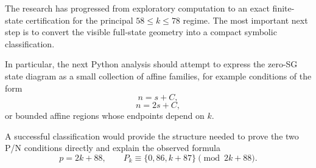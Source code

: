 \documentclass[11pt]{article}
\begin{document}
The research has progressed from exploratory computation to an exact finite-state certification for the principal $58\le k\le78$ regime. The most important next step is to convert the visible full-state geometry into a compact symbolic classification.

In particular, the next Python analysis should attempt to express the zero-SG state diagram as a small collection of affine families, for example conditions of the form
\begin{equation}
    n=s+C,
\end{equation}
\begin{equation}
    n=2s+C,
\end{equation}
or bounded affine regions whose endpoints depend on $k$.

A successful classification would provide the structure needed to prove the two P/N conditions directly and explain the observed formula
\begin{equation}
    p=2k+88,
    \qquad
    P_k\equiv\{0,86,k+87\}\pmod{2k+88}.
\end{equation}
\end{document}
